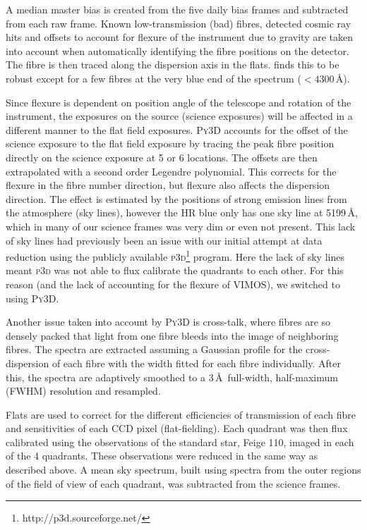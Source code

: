 		A median master bias is created from the five daily bias frames and subtracted from each raw frame. Known low-transmission (bad) fibres, detected cosmic ray hits and offsets to account for flexure of the instrument due to gravity are taken into account when automatically identifying the fibre positions on the detector. The fibre is then traced along the dispersion axis in the flats. \citet{Husemann2014} finds this to be robust except for a few fibres at the very blue end of the spectrum ($<4300$\,\AA). 

		Since flexure is dependent on position angle of the telescope and rotation of the instrument, the exposures on the source (science exposures) will be affected in a different manner to the flat field exposures. \textsc{Py3D} accounts for the offset of the science exposure to the flat field exposure by tracing the peak fibre position directly on the science exposure at 5 or 6 locations. The offsets are then extrapolated with a second order Legendre polynomial. This corrects for the flexure in the fibre number direction, but flexure also affects the dispersion direction. The effect is estimated by the positions of strong emission lines from the atmosphere (sky lines), however the HR blue only has one sky line at 5199\,\AA, which in many of our science frames was very dim or even not present. This lack of sky lines had previously been an issue with our initial attempt at data reduction using the publicly available \textsc{p3d}\footnote{http://p3d.sourceforge.net/} program. Here the lack of sky lines meant \textsc{p3d} was not able to flux calibrate the quadrants to each other. For this reason (and the lack of accounting for the flexure of VIMOS), we switched to using \textsc{Py3D}.

		Another issue taken into account by \textsc{Py3D} is cross-talk, where fibres are so densely packed that light from one fibre bleeds into the image of neighboring fibres. The spectra are extracted assuming a Gaussian profile for the cross-dispersion of each fibre with the width fitted for each fibre individually. After this, the spectra are adaptively smoothed to a 3\,\AA\ full-width, half-maximum (FWHM) resolution and resampled.

		Flats are used to correct for the different efficiencies of transmission of each fibre and sensitivities of each CCD pixel (flat-fielding). Each quadrant was then flux calibrated using the observations of the standard star, Feige 110, imaged in each of the 4 quadrants. These observations were reduced in the same way as described above. A mean sky spectrum, built using spectra from the outer regions of the field of view of each quadrant, was subtracted from the science frames. 

